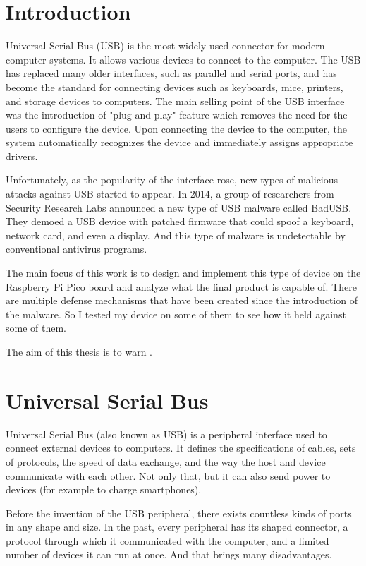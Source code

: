 \chapter{Introduction}
Universal Serial Bus (USB) is the most widely-used connector for modern computer systems. It allows various devices to connect to the computer. The USB has replaced many older interfaces, such as parallel and serial ports, and has become the standard for connecting devices such as keyboards, mice, printers, and storage devices to computers. The main selling point of the USB interface was the introduction of "plug-and-play" feature which removes the need for the users to configure the device. Upon connecting the device to the computer, the system automatically recognizes the device and immediately assigns appropriate drivers.

Unfortunately, as the popularity of the interface rose, new types of malicious attacks against USB started to appear. In 2014, a group of researchers from Security Research Labs announced a new type of USB malware called BadUSB. They demoed a USB device with patched firmware that could spoof a keyboard, network card, and even a display. And this type of malware is undetectable by conventional antivirus programs.

The main focus of this work is to design and implement this type of device on the Raspberry Pi Pico board and analyze what the final product is capable of. There are multiple defense mechanisms that have been created since the introduction of the malware. So I tested my device on some of them to see how it held against some of them.

The aim of this thesis is to warn .

\chapter{Universal Serial Bus}
\label{usb}
Universal Serial Bus (also known as USB) is a peripheral interface used to connect external devices to computers. It defines the specifications of cables, sets of protocols, the speed of data exchange, and the way the host and device communicate with each other. Not only that, but it can also send power to devices (for example to charge smartphones).

Before the invention of the USB peripheral, there exists countless kinds of ports in any shape and size. In the past, every peripheral has its shaped connector, a protocol through which it communicated with the computer, and a limited number of devices it can run at once. And that brings many disadvantages.

